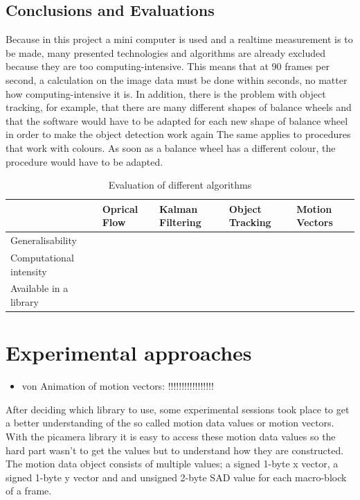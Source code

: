\documentclass[12pt, a4paper]{report}
\begin{document}
   \section{Conclusions and Evaluations}
   Because in this project a mini computer is used and a realtime measurement is to be made, many presented technologies and algorithms are already excluded because they are too computing-intensive.
   This means that at 90 frames per second, a calculation on the image data must be done within  seconds, no matter how computing-intensive it is.
   In addition, there is the problem with object tracking, for example, that there are many different shapes of balance wheels and that the software would have to be adapted for each new shape of balance wheel in order to make the object detection work again
   The same applies to procedures that work with colours. As soon as a balance wheel has a different colour, the procedure would have to be adapted.
  
   \begin{table}[H]
    
      \centering
        \begin{tabularx}{\linewidth}{ |>{\hsize}L|>{\hsize}L|>{\hsize}L|>{\hsize}L|>{\hsize}L|  }
        \hline
        \textbf{} &  \textbf{Oprical Flow} &  \textbf{Kalman Filtering}&  \textbf{Object Tracking} &  \textbf{Motion Vectors} \\ \hline
        Generalisability            &         &     &    &           \\ \hline
        Computational intensity     &         &     &     &       \\ \hline
        Available in a library      &         &     &     &        \\ \hline
      \end{tabularx}
    \caption{Evaluation of different algorithms}
    \end{table}

    \chapter {Experimental approaches}
    \begin{itemize}
      \item  von Animation of motion vectors: !!!!!!!!!!!!!!!!!
    \end{itemize}
    After deciding which library to use, some experimental sessions took place to get a better understanding of the so called motion data values or motion vectors. 
    With the picamera library it is easy to access these motion data values so the hard part wasn't to get the values but to understand how they are constructed. 
    The motion data object consists of multiple values; a signed 1-byte x vector, a signed 1-byte y vector and and unsigned 2-byte SAD value for each macro-block of a frame.
    
\end{document}
